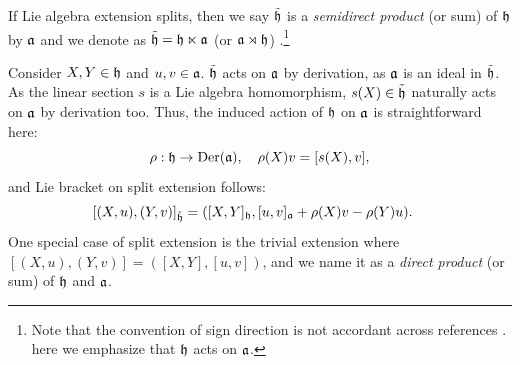 If Lie algebra extension splits, then
we say $\tilde{\mathfrak{h}}$ is a \emph{semidirect product} (or sum) of $\mathfrak{h}$ by $\mathfrak{a}$
and we denote as $\tilde{\mathfrak{h}} = \mathfrak{h} \ltimes \mathfrak{a}$
(or $\mathfrak{a} \rtimes \mathfrak{h}$) \cite{rotman2009introduction}.\footnote{Note
that the convention of sign direction is not accordant across references \cite{petrogradsky2007wreath, rotman2009introduction}.
here we emphasize that $\mathfrak{h}$ acts on $\mathfrak{a}$.}

Consider $X,Y \in \mathfrak{h}$ and $u,v \in \mathfrak{a}$.
$\tilde{\mathfrak{h}}$ acts on $\mathfrak{a}$ by derivation, as $\mathfrak{a}$ is an ideal in $\tilde{\mathfrak{h}}$.
As the linear section $s$ is a Lie algebra homomorphism,
$s(X) \in \tilde{\mathfrak{h}}$ naturally acts on $\mathfrak{a}$ by derivation too.
Thus, the induced action of $\mathfrak{h}$ on $\mathfrak{a}$ is straightforward here:
\begin{equation*}
    \rho: \mathfrak{h} \to \text{Der}(\mathfrak{a}),
    \quad
    \rho(X)v = [s(X),v],
\end{equation*}
and Lie bracket on split extension follows:
\begin{align}
\label{app:eq_split_bracket}
    [(X, u), (Y, v)]_{\tilde{\mathfrak{h}}} &= ([X,Y]_{\mathfrak{h}}, [u,v]_{\mathfrak{a}} + \rho(X)v - \rho(Y)u).
\end{align}
One special case of split extension is the trivial extension where $[(X,u),(Y,v)] = ([X,Y],[u,v])$,
and we name it as a \emph{direct product} (or sum) of $\mathfrak{h}$ and $\mathfrak{a}$.

